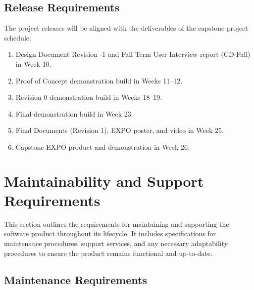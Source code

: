 \documentclass[12pt]{article}
\begin{document}
\subsection{Release Requirements}
The project releases will be aligned with the deliverables of the capstone project schedule:
\begin{enumerate}
    \item Design Document Revision -1 and Fall Term User Interview report (CD-Fall) in Week 10.
    \item Proof of Concept demonstration build in Weeks 11--12.
    \item Revision 0 demonstration build in Weeks 18--19.
    \item Final demonstration build in Week 23.
    \item Final Documents (Revision 1), EXPO poster, and video in Week 25.
    \item Capstone EXPO product and demonstration in Week 26.
\end{enumerate}   


\section{Maintainability and Support Requirements}

This section outlines the requirements for maintaining and supporting the software product throughout its lifecycle. It includes specifications for maintenance procedures, support services, and any necessary adaptability procedures to ensure the product remains functional and up-to-date.

\subsection{Maintenance Requirements}
\end{document}
